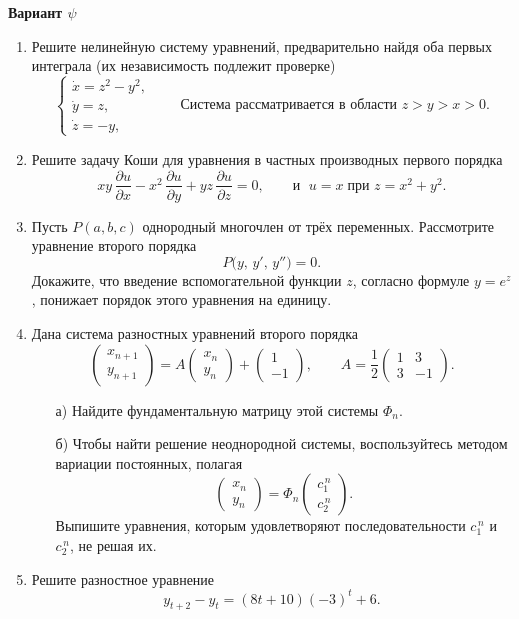 \documentclass[12pt]{article}
\begin{document}
\begin{center}
\textbf{Вариант $\psi$}
\end{center}

\begin{enumerate}
\item Решите нелинейную систему уравнений, предварительно найдя оба первых интеграла (их независимость подлежит проверке)
\[
\begin{cases}
\dot x = z^{2}-y^{2},\\[2pt]
\dot y = z,\\[2pt]
\dot z = -y,
\end{cases}
\qquad
\text{Система рассматривается в области } z>y>x>0.
\]

\item Решите задачу Коши для уравнения в частных производных первого порядка
\[
xy\,\frac{\partial u}{\partial x}
- x^{2}\,\frac{\partial u}{\partial y}
+ yz\,\frac{\partial u}{\partial z}=0,
\qquad
\text{и } \; u = x \; \text{при } z = x^{2}+y^{2}.
\]

\item Пусть $P(a,b,c)$ однородный многочлен от трёх переменных. Рассмотрите уравнение второго порядка
\[
P\bigl(y,\,y',\,y''\bigr)=0.
\]
Докажите, что введение вспомогательной функции $z$, согласно формуле $y=e^{z}$, понижает порядок этого уравнения на единицу.

\item Дана система разностных уравнений второго порядка
\[
\begin{pmatrix}
x_{n+1}\\[2pt]
y_{n+1}
\end{pmatrix}
=
A
\begin{pmatrix}
x_{n}\\[2pt]
y_{n}
\end{pmatrix}
+
\begin{pmatrix}
1\\[2pt]
-1
\end{pmatrix},
\qquad
A=\frac12
\begin{pmatrix}
1 & 3\\
3 & -1
\end{pmatrix}.
\]
\begin{enumerate}
\item[а)] Найдите фундаментальную матрицу этой системы $\Phi_n$.
\item[б)] Чтобы найти решение неоднородной системы, воспользуйтесь методом вариации постоянных, полагая
\[
\begin{pmatrix}
x_{n}\\[2pt]
y_{n}
\end{pmatrix}
=
\Phi_{n}
\begin{pmatrix}
c_{1}^{\,n}\\[2pt]
c_{2}^{\,n}
\end{pmatrix}.
\]
Выпишите уравнения, которым удовлетворяют последовательности $c_{1}^{\,n}$ и $c_{2}^{\,n}$, не решая их.
\end{enumerate}

\item Решите разностное уравнение
\[
y_{t+2}-y_{t}=(8t+10)(-3)^{t}+6.
\]
\end{enumerate}
\end{document}
